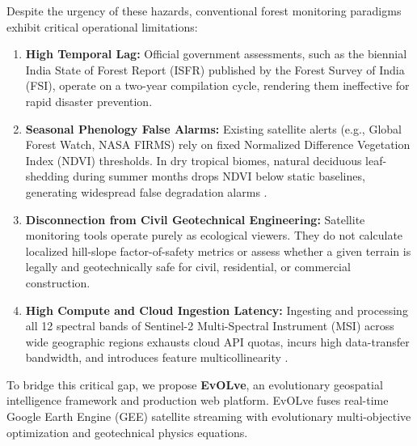 \documentclass[conference]{IEEEtran}
\begin{document}
Despite the urgency of these hazards, conventional forest monitoring paradigms exhibit critical operational limitations:
\begin{enumerate}
    \item \textbf{High Temporal Lag:} Official government assessments, such as the biennial India State of Forest Report (ISFR) published by the Forest Survey of India (FSI), operate on a two-year compilation cycle, rendering them ineffective for rapid disaster prevention.
    \item \textbf{Seasonal Phenology False Alarms:} Existing satellite alerts (e.g., Global Forest Watch, NASA FIRMS) rely on fixed Normalized Difference Vegetation Index (NDVI) thresholds. In dry tropical biomes, natural deciduous leaf-shedding during summer months drops NDVI below static baselines, generating widespread false degradation alarms \cite{verbesselt2010detecting}.
    \item \textbf{Disconnection from Civil Geotechnical Engineering:} Satellite monitoring tools operate purely as ecological viewers. They do not calculate localized hill-slope factor-of-safety metrics or assess whether a given terrain is legally and geotechnically safe for civil, residential, or commercial construction.
    \item \textbf{High Compute and Cloud Ingestion Latency:} Ingesting and processing all 12 spectral bands of Sentinel-2 Multi-Spectral Instrument (MSI) across wide geographic regions exhausts cloud API quotas, incurs high data-transfer bandwidth, and introduces feature multicollinearity \cite{drusch2012sentinel}.
\end{enumerate}

To bridge this critical gap, we propose \textbf{EvOLve}, an evolutionary geospatial intelligence framework and production web platform. EvOLve fuses real-time Google Earth Engine (GEE) satellite streaming \cite{gorelick2017google} with evolutionary multi-objective optimization \cite{deb2002fast} and geotechnical physics equations. 
\end{document}
